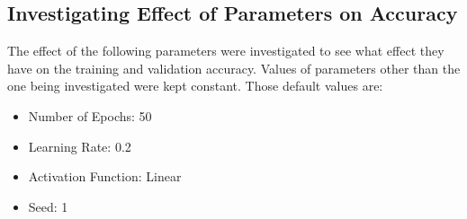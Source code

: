 \documentclass{article}
\begin{document}
\subsection{Investigating Effect of Parameters on Accuracy}
\label{subsec:effect_of_parameters_on_accuracy}
The effect of the following parameters were investigated to see what effect
they have on the training and validation accuracy. Values of parameters other
than the one being investigated were kept constant. Those default values are:
\begin{itemize}
  \item Number of Epochs: 50
  \item Learning Rate: 0.2
  \item Activation Function: Linear
  \item Seed: 1
\end{itemize}
\end{document}

